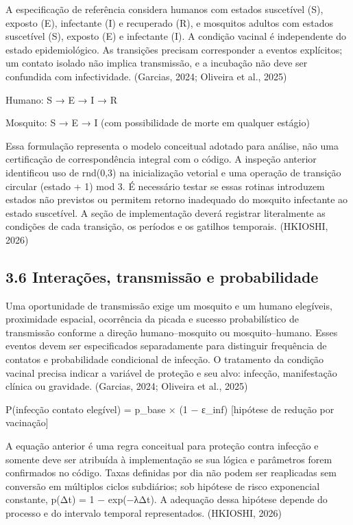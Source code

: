A especificação de referência considera humanos com estados suscetível
(S), exposto (E), infectante (I) e recuperado (R), e mosquitos adultos
com estados suscetível (S), exposto (E) e infectante (I). A condição
vacinal é independente do estado epidemiológico. As transições precisam
corresponder a eventos explícitos; um contato isolado não implica
transmissão, e a incubação não deve ser confundida com infectividade.
(Garcias, 2024; Oliveira et al., 2025)

Humano: S → E → I → R

Mosquito: S → E → I (com possibilidade de morte em qualquer estágio)

Essa formulação representa o modelo conceitual adotado para análise, não
uma certificação de correspondência integral com o código. A inspeção
anterior identificou uso de rnd(0,3) na inicialização vetorial e uma
operação de transição circular (estado + 1) mod 3. É necessário testar
se essas rotinas introduzem estados não previstos ou permitem retorno
inadequado do mosquito infectante ao estado suscetível. A seção de
implementação deverá registrar literalmente as condições de cada
transição, os períodos e os gatilhos temporais. (HKIOSHI, 2026)

\subsection{3.6 Interações, transmissão e
probabilidade}\label{interauxe7uxf5es-transmissuxe3o-e-probabilidade}

Uma oportunidade de transmissão exige um mosquito e um humano elegíveis,
proximidade espacial, ocorrência da picada e sucesso probabilístico de
transmissão conforme a direção humano--mosquito ou mosquito--humano.
Esses eventos devem ser especificados separadamente para distinguir
frequência de contatos e probabilidade condicional de infecção. O
tratamento da condição vacinal precisa indicar a variável de proteção e
seu alvo: infecção, manifestação clínica ou gravidade. (Garcias, 2024;
Oliveira et al., 2025)

P(infecção \textbar{} contato elegível) = p\_base × (1 − ε\_inf)
{[}hipótese de redução por vacinação{]}

A equação anterior é uma regra conceitual para proteção contra infecção
e somente deve ser atribuída à implementação se sua lógica e parâmetros
forem confirmados no código. Taxas definidas por dia não podem ser
reaplicadas sem conversão em múltiplos ciclos subdiários; sob hipótese
de risco exponencial constante, p(Δt) = 1 − exp(−λΔt). A adequação dessa
hipótese depende do processo e do intervalo temporal representados.
(HKIOSHI, 2026)

